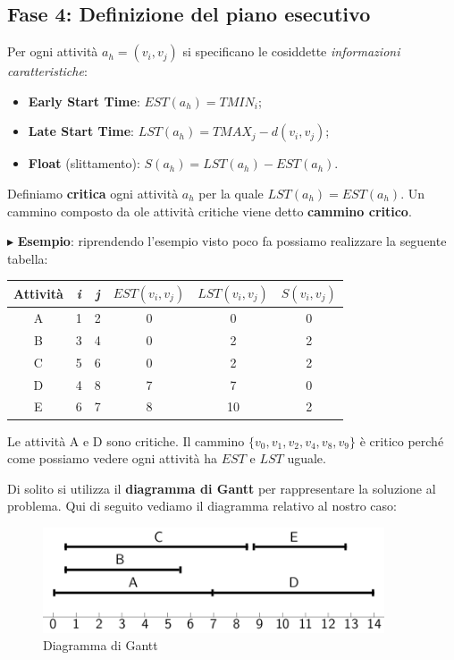 \documentclass[11pt]{book}
\begin{document}
\subsection{Fase 4: Definizione del piano esecutivo}

Per ogni attivit\`a $a_h = (v_i, v_j)$ si specificano le cosiddette
{\em informazioni caratteristiche}:

\begin{itemize}
\item {\bf Early Start Time}: $EST(a_h) = TMIN_i$;
\item {\bf Late Start Time}: $LST(a_h) = TMAX_j - d(v_i,v_j)$;
\item {\bf Float} (slittamento): $S(a_h) = LST(a_h) - EST(a_h)$.
\end{itemize}

Definiamo {\bf critica} ogni attivit\`a $a_h$ per la quale $LST(a_h) =
EST(a_h)$. Un cammino composto da ole attivit\`a critiche viene detto
{\bf cammino critico}.

\vspace{11pt}
$\blacktriangleright$ {\bf Esempio}: riprendendo l'esempio visto poco
fa possiamo realizzare la seguente tabella:

\vspace{11pt}
\begin{tabular}{cccccc}
  {\bf Attivit\`a} & {\em i} & {\em j} & $EST(v_i,v_j)$ &
  $LST(v_i,v_j)$ & $S(v_i,v_j)$ \\\hline
A & 1 & 2 & 0 & 0 & 0 \\
B & 3 & 4 & 0 & 2 & 2 \\
C & 5 & 6 & 0 & 2 & 2 \\
D & 4 & 8 & 7 & 7 & 0 \\
E & 6 & 7 & 8 & 10 & 2 \\
\end{tabular}
\vspace{11pt}

Le attivit\`a A e D sono critiche. Il cammino
$\{v_0,v_1,v_2,v_4,v_8,v_9 \}$ \`e critico perch\'e come possiamo
vedere ogni attivit\`a ha $EST$ e $LST$ uguale.

Di solito si utilizza il {\bf diagramma di Gantt} per rappresentare la
soluzione al problema. Qui di seguito vediamo il diagramma relativo al
nostro caso:

\begin{figure}[H]
  \centering
  \includegraphics[width=0.9\textwidth]{images/cap7figura715.png}
  \caption{Diagramma di Gantt}
  \label{cap7figura715}
\end{figure}
\end{document}
